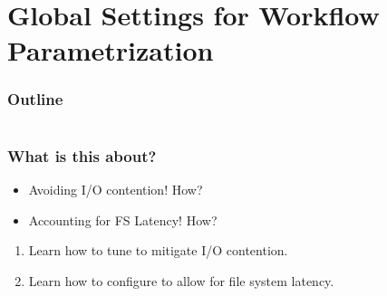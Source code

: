 \section{Global Settings for Workflow Parametrization}

\begin{frame}
    \frametitle{Outline}
    \begin{columns}[t]
        \begin{column}{.5\textwidth}
            \tableofcontents[sections={1-7},currentsection]
        \end{column}
        \begin{column}{.5\textwidth}
            \tableofcontents[sections={8-15},currentsection]
        \end{column}
    \end{columns}
\end{frame}

\begin{frame}
  \frametitle{What is this about?}
  \begin{question}[Questions]
   	\begin{itemize}
      \item Avoiding I/O contention! How?
      \item Accounting for FS Latency! How?
    \end{itemize}
  \end{question}
   \begin{docs}[Objectives]
   	 \begin{enumerate} 
        \item Learn how to tune \Snakemake{} to mitigate I/O contention.
        \item Learn how to configure \Snakemake{} to allow for file system latency.
    \end{enumerate}
  \end{docs}
\end{frame}

